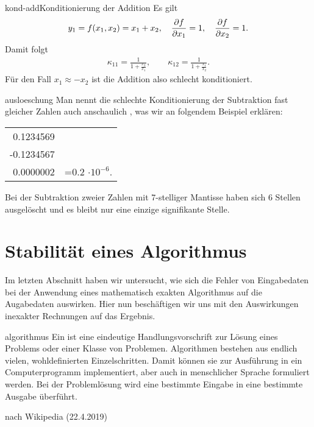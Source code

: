 \begin{Beispiel*}{kond-add}{Konditionierung der Addition}
  Es gilt
  \begin{gather}
    y_1 = f(x_1,x_2) = x_1 + x_2,
    \quad \frac{\partial f}{\partial x_1} = 1,
    \quad \frac{\partial f}{\partial x_2} = 1.
  \end{gather}
  Damit folgt
  \begin{gather}
    \kappa_{11} = \frac{1}{1+\frac{x_2}{x_1}},
    \qquad\kappa_{12} = \frac{1}{1+\frac{x_1}{x_2}}.
  \end{gather}
  Für den Fall $x_1 \approx -x_2$ ist die Addition also schlecht konditioniert.
\end{Beispiel*}

\begin{Bemerkung}{ausloeschung}
  Man nennt die schlechte Konditionierung der Subtraktion fast
  gleicher Zahlen auch anschaulich , was wir an
  folgendem Beispiel erklären:
  \begin{center}
    \begin{tabular}{r@{}l}
      0.1234569&\\
      -0.1234567&\\\hline
      0.0000002&=0.2 $\cdot 10^{-6}$.
    \end{tabular}
  \end{center}
  Bei der Subtraktion zweier Zahlen mit 7-stelliger Mantisse haben
  sich 6 Stellen ausgelöscht und es bleibt nur eine einzige
  signifikante Stelle.
\end{Bemerkung}

\section{Stabilität eines Algorithmus}

\begin{intro}
  Im letzten Abschnitt haben wir untersucht, wie sich die Fehler von
  Eingabedaten bei der Anwendung eines mathematisch exakten
  Algorithmus auf die Augabedaten auswirken. Hier nun beschäftigen wir
  uns mit den Auswirkungen inexakter Rechnungen auf das Ergebnis.
\end{intro}

\begin{Definition}{algorithmus}
  Ein  ist eine eindeutige Handlungsvorschrift zur Lösung
  eines Problems oder einer Klasse von Problemen. Algorithmen bestehen
  aus endlich vielen, wohldefinierten Einzelschritten. Damit können
  sie zur Ausführung in ein Computerprogramm implementiert, aber auch
  in menschlicher Sprache formuliert werden. Bei der Problemlösung
  wird eine bestimmte Eingabe in eine bestimmte Ausgabe überführt.

  \hfill nach Wikipedia (22.4.2019)
\end{Definition}

